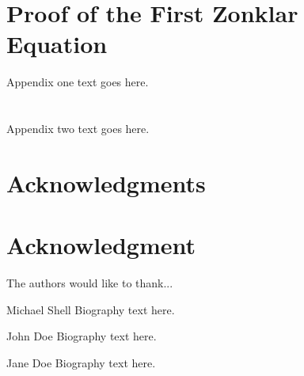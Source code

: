 \documentclass[10pt,journal,compsoc]{IEEEtran}
\begin{document}
\appendices
\section{Proof of the First Zonklar Equation}
Appendix one text goes here.

\section{}
Appendix two text goes here.


\ifCLASSOPTIONcompsoc
  \section*{Acknowledgments}
\else
  \section*{Acknowledgment}
\fi


The authors would like to thank...


\ifCLASSOPTIONcaptionsoff
  \newpage
\fi






\begin{IEEEbiography}{Michael Shell}
Biography text here.
\end{IEEEbiography}

\begin{IEEEbiographynophoto}{John Doe}
Biography text here.
\end{IEEEbiographynophoto}


\begin{IEEEbiographynophoto}{Jane Doe}
Biography text here.
\end{IEEEbiographynophoto}
\end{document}
